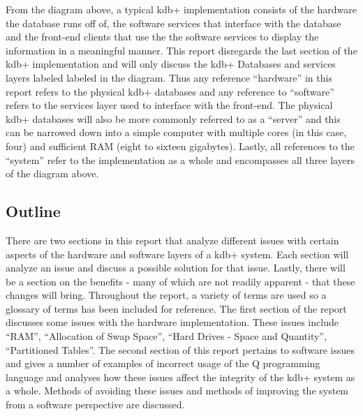 From the diagram above, a typical kdb+ implementation consists of the hardware the database runs off of, the software services that interface with the database and the front-end clients that use the the software services to display the information in a meaningful manner.  This report disregards the last section of the kdb+ implementation and will only discuss the kdb+ Databases and services layers labeled labeled in the diagram.  Thus any reference ``hardware'' in this report refers to the physical kdb+ databases and any reference to ``software'' refers to the services layer used to interface with the front-end. The physical kdb+ databases will also be more commonly referred to as a ``server'' and this can be narrowed down into a simple computer with multiple cores (in this case, four) and sufficient RAM (eight to sixteen gigabytes).  Lastly, all references to the ``system'' refer to the implementation as a whole and encompasses all three layers of the diagram above.\\

	\subsection{Outline} %
	\label{sub:outline}
There are two sections in this report that analyze different issues with certain aspects of the hardware and software layers of a kdb+ system.  Each section will analyze an issue and discuss a possible solution for that issue.  Lastly, there will be a section on the benefits - many of which are not readily apparent - that these changes will bring.  Throughout the report, a variety of terms are used so a glossary of terms has been included for reference. The first section of the report discusses some issues with the hardware implementation.  These issues include ``RAM'', ``Allocation of Swap Space'', ``Hard Drives - Space and Quantity'', ``Partitioned Tables''.  The second section of this report pertains to software issues and gives a number of examples of incorrect usage of the Q programming language and analyses how these issues affect the integrity of the kdb+ system as a whole.  Methods of avoiding these issues and methods of improving the system from a software perspective are discussed.

